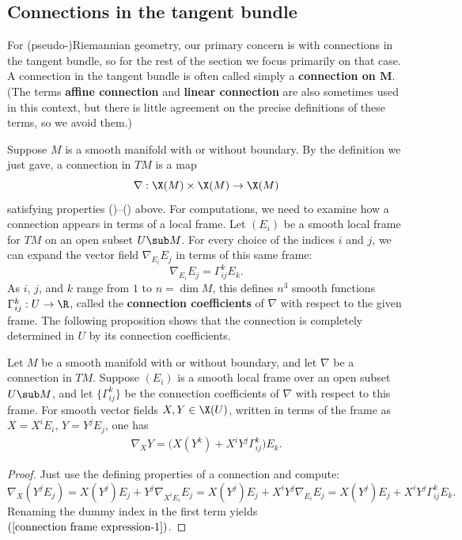 \subsection{Connections in the tangent bundle}
For (pseudo-)Riemannian geometry, our primary concern is with connections
in the tangent bundle, so for the rest of the section we focus primarily on that case. A connection in the tangent bundle is often called simply a \textbf{connection on $\bm{M}$}. (The terms \textbf{affine connection} and \textbf{linear connection} are also sometimes used in this context, but there is little agreement on the precise definitions of these terms, so we avoid them.)\par
Suppose $M$ is a smooth manifold with or without boundary. By the definition we just gave, a connection in $TM$ is a map
\[\nabla:\X(M)\times\X(M)\to\X(M)\]
satisfying properties ()--() above. For computations, we need to examine how a connection appears in terms of a local frame. Let $(E_i)$ be a smooth local frame for $TM$ on an open subset $U\sub M$. For every choice of the indices $i$ and $j$, we can expand the vector field $\nabla_{E_i}E_j$ in terms of this same frame:
\[\nabla_{E_i}E_j=\Gamma_{ij}^kE_k.\]
As $i$, $j$, and $k$ range from $1$ to $n=\dim M$, this defines $n^3$ smooth functions $\Gamma_{ij}^k:U\to \R$, called the \textbf{connection coefficients} of $\nabla$ with respect to the given frame. The following proposition shows that the connection is completely determined in $U$ by its connection coefficients.
\begin{proposition}\label{connection frame expression}
Let $M$ be a smooth manifold with or without boundary, and let $\nabla$ be a connection in $TM$. Suppose $(E_i)$ is a smooth local frame over an open subset $U\sub M$, and let $\{\Gamma_{ij}^k\}$ be the connection coefficients of $\nabla$ with respect to this frame. For smooth vector fields $X,Y\in\X(U)$, written in terms of the frame as $X=X^iE_i$, $Y=Y^jE_j$, one has
\begin{align}\label{connection frame expression-1}
\nabla_XY=\big(X(Y^k)+X^iY^j\Gamma_{ij}^k\big)E_k.
\end{align}
\end{proposition}
\begin{proof}
Just use the defining properties of a connection and compute:
\[\nabla_X(Y^jE_j)=X(Y^j)E_j+Y^j\nabla_{X^iE_i}E_j=X(Y^j)E_j+X^iY^j\nabla_{E_i}E_j=X(Y^j)E_j+X^iY^j\Gamma_{ij}^kE_k.\]
Renaming the dummy index in the first term yields $(\ref{connection frame expression-1})$.
\end{proof}
